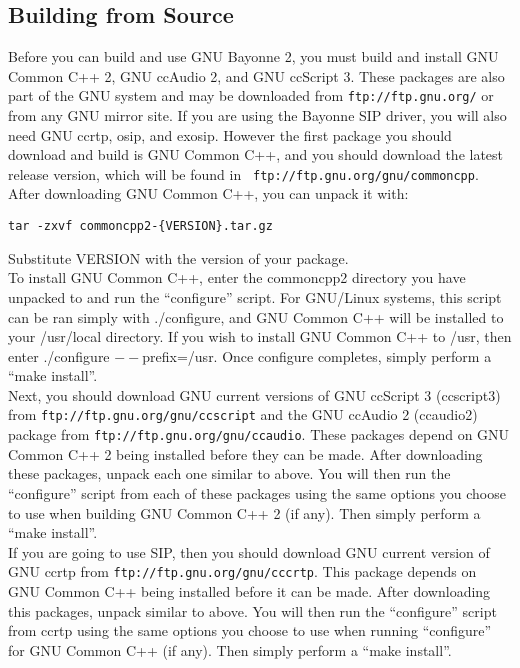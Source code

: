 \documentclass[a4paper,12pt]{article}
\begin{document}
\subsection{Building from Source}

Before you can build and use GNU Bayonne 2, you must build and install
GNU Common C++ 2, GNU ccAudio 2, and GNU ccScript 3.  These packages are
also part of the GNU system and may be downloaded from {\tt ftp://ftp.gnu.org/}
or from any GNU mirror site.  If you are using the Bayonne SIP driver,
you will also need GNU ccrtp, osip, and exosip.  However the first
package you should download and build is GNU Common C++, and you should
download the latest release version, which will be found in {\tt
ftp://ftp.gnu.org/gnu/commoncpp}. \\

After downloading GNU Common C++, you can unpack it with: \\

\begin{verbatim}
tar -zxvf commoncpp2-{VERSION}.tar.gz
\end{verbatim}

Substitute VERSION with the version of your package. \\

To install GNU Common C++, enter the commoncpp2 directory you have unpacked
to and run the ``configure'' script.  For GNU/Linux systems, this script
can be ran simply with ./configure, and GNU Common C++ will be installed
to your /usr/local directory.  If you wish to install GNU Common C++ to
/usr, then enter ./configure $--$prefix=/usr.  Once configure completes,
simply perform a ``make install''. \\

Next, you should download GNU current versions of GNU ccScript 3
(ccscript3) from {\tt ftp://ftp.gnu.org/gnu/ccscript} and the GNU
ccAudio 2 (ccaudio2) package from {\tt ftp://ftp.gnu.org/gnu/ccaudio}. 
These packages depend on GNU Common C++ 2 being installed before they can
be made.  After downloading these packages, unpack each one similar to
above.  You will then run the ``configure'' script from each of these
packages using the same options you choose to use when building GNU
Common C++ 2 (if any).  Then simply perform a ``make install''. \\

If you are going to use SIP, then you should download GNU current
version of GNU ccrtp from {\tt ftp://ftp.gnu.org/gnu/cccrtp}.  This
package depends on GNU Common C++ being installed before it can be made. 
After downloading this packages, unpack similar to above.  You will then
run the ``configure'' script from ccrtp using the same options you
choose to use when running ``configure'' for GNU Common C++ (if any). 
Then simply perform a ``make install''. \\
\end{document}
